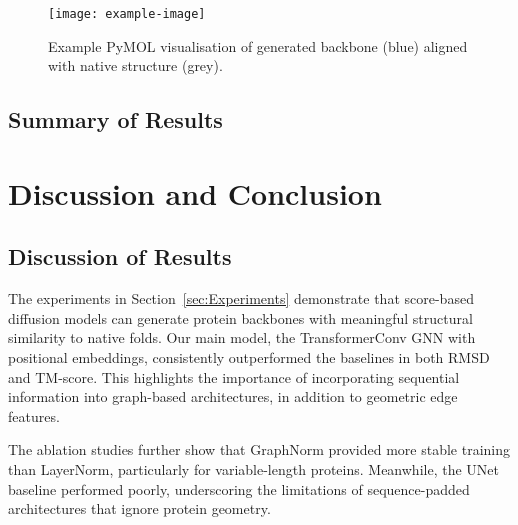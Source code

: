 \documentclass[a4paper,12pt]{article}
\begin{document}
\begin{figure}[h!]
\centering
\texttt{[image: example-image]}
\caption{Example PyMOL visualisation of generated backbone (blue) aligned with native structure (grey).}
\label{fig:pymol-example}
\end{figure}

\subsection{Summary of Results}\label{subsec:results-summary}

\clearpage

\section{Discussion and Conclusion}\label{sec:Discussion_and_Conclusion}
\subsection{Discussion of Results}\label{subsec:discussion-results}
The experiments in Section~\ref{sec:Experiments} demonstrate that score-based diffusion models can generate protein backbones with meaningful structural similarity to native folds. Our main model, the TransformerConv GNN with positional embeddings, consistently outperformed the baselines in both RMSD and TM-score. This highlights the importance of incorporating sequential information into graph-based architectures, in addition to geometric edge features. 

The ablation studies further show that GraphNorm provided more stable training than LayerNorm, particularly for variable-length proteins. Meanwhile, the UNet baseline performed poorly, underscoring the limitations of sequence-padded architectures that ignore protein geometry. 
\end{document}
